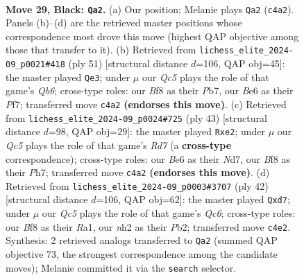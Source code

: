 \documentclass[11pt]{article}
\begin{document}
\clearpage

\begin{figure}[p]\centering
\begin{subfigure}{0.46\textwidth}\centering
\resizebox{\linewidth}{!}{%
\newchessgame
\chessboard[
  setfen={rk3b2/pp4pr/2p1b2p/P2p1p2/2qP3P/2B1P3/1PK2PPN/1R3Q1R b - - 10 29},
  showmover=false,
  pgfstyle=straightmove, color=movearrow, markmove={c4-a2}
]}
\caption{}
\end{subfigure}\hfill
\begin{subfigure}{0.46\textwidth}\centering
\resizebox{\linewidth}{!}{%
\newchessgame
\chessboard[
  setfen={5k1r/1p3pp1/4p2p/p2pP3/P2PbPP1/1q6/2r1BR1P/1R1Q2K1 b - - 1 26},
  showmover=false,
  pgfstyle=straightmove, color=movearrow, markmove={b3-e3}
]}
\caption{}
\end{subfigure}
\\[4pt]
\begin{subfigure}{0.46\textwidth}\centering
\resizebox{\linewidth}{!}{%
\newchessgame
\chessboard[
  setfen={2r3k1/3n1ppp/4pb2/2p5/1qPp4/1P4P1/3rPPBP/1RQ1NRK1 b - - 3 22},
  showmover=false,
  pgfstyle=straightmove, color=movearrow, markmove={d2-e2}
]}
\caption{}
\end{subfigure}\hfill
\begin{subfigure}{0.46\textwidth}\centering
\resizebox{\linewidth}{!}{%
\newchessgame
\chessboard[
  setfen={r3rk2/3q2p1/1pQpb2p/p4p2/3P4/P1P5/1P1B1PPP/R3R1K1 w - - 1 22},
  showmover=false,
  pgfstyle=straightmove, color=movearrow, markmove={c6-d7}
]}
\caption{}
\end{subfigure}
\caption{\textbf{Move 29, Black: \texttt{Qa2}.} (a) Our position; Melanie plays \texttt{Qa2} (\texttt{c4a2}). Panels (b)--(d) are the retrieved master positions whose correspondence most drove this move (highest QAP objective among those that transfer to it). (b) Retrieved from \texttt{lichess\_elite\_2024-09\_p0021\#418} (ply 51) [structural distance $d$=106, QAP obj=45]: the master played \texttt{Qe3}; under $\mu$ our \emph{Qc5} plays the role of that game's \emph{Qb6}; cross-type roles: our \emph{B}f8 as their \emph{P}b7, our \emph{B}e6 as their \emph{P}f7; transferred move \texttt{c4a2} \textbf{(endorses this move)}. (c) Retrieved from \texttt{lichess\_elite\_2024-09\_p0024\#725} (ply 43) [structural distance $d$=98, QAP obj=29]: the master played \texttt{Rxe2}; under $\mu$ our \emph{Qc5} plays the role of that game's \emph{Rd7} (a \textbf{cross-type} correspondence); cross-type roles: our \emph{B}e6 as their \emph{N}d7, our \emph{B}f8 as their \emph{P}h7; transferred move \texttt{c4a2} \textbf{(endorses this move)}. (d) Retrieved from \texttt{lichess\_elite\_2024-09\_p0003\#3707} (ply 42) [structural distance $d$=106, QAP obj=62]: the master played \texttt{Qxd7}; under $\mu$ our \emph{Qc5} plays the role of that game's \emph{Qc6}; cross-type roles: our \emph{B}f8 as their \emph{R}a1, our \emph{n}h2 as their \emph{P}b2; transferred move \texttt{c4e2}. Synthesis: 2 retrieved analogs transferred to \texttt{Qa2} (summed QAP objective 73, the strongest correspondence among the candidate moves); Melanie committed it via the \texttt{search} selector.}
\label{fig:thought-m57}
\end{figure}
\end{document}
